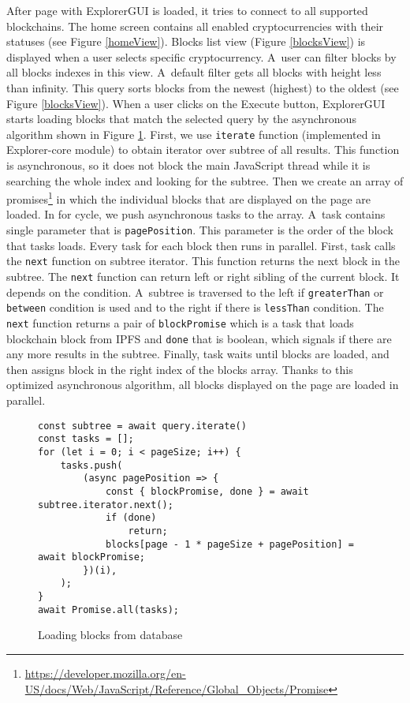 After page with ExplorerGUI is loaded, it tries to connect to all supported blockchains. The home screen contains all enabled cryptocurrencies with their statuses (see Figure \ref{homeView}). Blocks list view (Figure \ref{blocksView}) is displayed when a user selects specific cryptocurrency. A~user can filter blocks by all blocks indexes in this view. A~default filter gets all blocks with height less than infinity. This query sorts blocks from the newest (highest) to the oldest (see Figure \ref{blocksView}). When a user clicks on the Execute button, ExplorerGUI starts loading blocks that match the selected query by the asynchronous algorithm shown in Figure \ref{blocksLoading}. First, we use \texttt{iterate} function (implemented in Explorer-core module) to obtain iterator over subtree of all results. This function is asynchronous, so it does not block the main JavaScript thread while it is searching the whole index and looking for the subtree. Then we create an array of promises\footnote{\url{https://developer.mozilla.org/en-US/docs/Web/JavaScript/Reference/Global_Objects/Promise}} in which the individual blocks that are displayed on the page are loaded. In for cycle, we push asynchronous tasks to the array. A~task contains single parameter that is \texttt{pagePosition}. This parameter is the order of the block that tasks loads. Every task for each block then runs in parallel. First, task calls the \texttt{next} function on subtree iterator. This function returns the next block in the subtree. The \texttt{next} function can return left or right sibling of the current block. It depends on the condition. A~subtree is traversed to the left if \texttt{greaterThan} or \texttt{between} condition is used and to the right if there is \texttt{lessThan} condition. The \texttt{next} function returns a pair of \texttt{blockPromise} which is a task that loads blockchain block from IPFS and \texttt{done} that is boolean, which signals if there are any more results in the subtree. Finally, task waits until blocks are loaded, and then assigns block in the right index of the blocks array. Thanks to this optimized asynchronous algorithm, all blocks displayed on the page are loaded in parallel.

\begin{figure}[h]
    \centering
    \begin{lstlisting}[style=ES6]
const subtree = await query.iterate()
const tasks = [];
for (let i = 0; i < pageSize; i++) {
    tasks.push(
        (async pagePosition => {
            const { blockPromise, done } = await subtree.iterator.next();
            if (done)
                return;
            blocks[page - 1 * pageSize + pagePosition] = await blockPromise;
        })(i),
    );
}
await Promise.all(tasks);
    \end{lstlisting}
    \caption{Loading blocks from database}
    \label{blocksLoading}
\end{figure}



